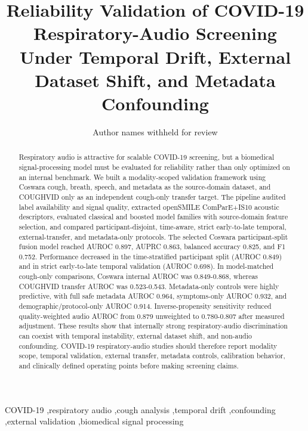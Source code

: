 \documentclass[preprint,12pt]{elsarticle}
\begin{document}
\begin{frontmatter}

\title{Reliability Validation of COVID-19 Respiratory-Audio Screening Under Temporal Drift, External Dataset Shift, and Metadata Confounding}

\author[inst1]{Author names withheld for review}
\address[inst1]{Institutional affiliation withheld for review}

\begin{abstract}
Respiratory audio is attractive for scalable COVID-19 screening, but a biomedical signal-processing model must be evaluated for reliability rather than only optimized on an internal benchmark. We built a modality-scoped validation framework using Coswara cough, breath, speech, and metadata as the source-domain dataset, and COUGHVID only as an independent cough-only transfer target. The pipeline audited label availability and signal quality, extracted openSMILE ComParE+IS10 acoustic descriptors, evaluated classical and boosted model families with source-domain feature selection, and compared participant-disjoint, time-aware, strict early-to-late temporal, external-transfer, and metadata-only protocols. The selected Coswara participant-split fusion model reached AUROC 0.897, AUPRC 0.863, balanced accuracy 0.825, and F1 0.752. Performance decreased in the time-stratified participant split (AUROC 0.849) and in strict early-to-late temporal validation (AUROC 0.698). In model-matched cough-only comparisons, Coswara internal AUROC was 0.849-0.868, whereas COUGHVID transfer AUROC was 0.523-0.543. Metadata-only controls were highly predictive, with full safe metadata AUROC 0.964, symptoms-only AUROC 0.932, and demographic/protocol-only AUROC 0.914. Inverse-propensity sensitivity reduced quality-weighted audio AUROC from 0.879 unweighted to 0.780-0.807 after measured adjustment. These results show that internally strong respiratory-audio discrimination can coexist with temporal instability, external dataset shift, and non-audio confounding. COVID-19 respiratory-audio studies should therefore report modality scope, temporal validation, external transfer, metadata controls, calibration behavior, and clinically defined operating points before making screening claims.
\end{abstract}

\begin{keyword}
COVID-19 \sep respiratory audio \sep cough analysis \sep temporal drift \sep confounding \sep external validation \sep biomedical signal processing
\end{keyword}

\end{frontmatter}
\end{document}
